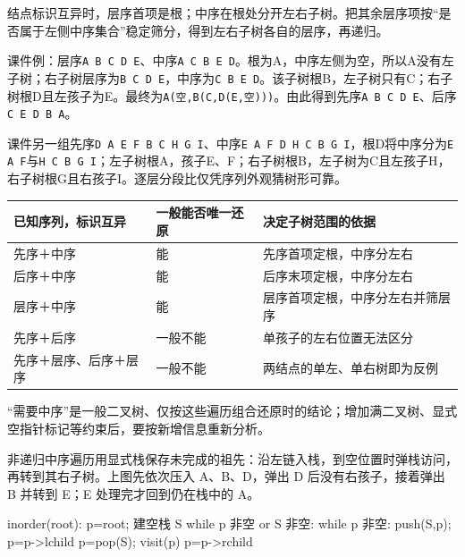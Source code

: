 结点标识互异时，层序首项是根；中序在根处分开左右子树。把其余层序项按``是否属于左侧中序集合''稳定筛分，得到左右子树各自的层序，再递归。

课件例：层序\texttt{A B C D E}、中序\texttt{A C B E D}。根为A，中序左侧为空，所以A没有左子树；右子树层序为\texttt{B C D E}，中序为\texttt{C B E D}。该子树根B，左子树只有C；右子树根D且左孩子为E。最终为\texttt{A(\allowbreak{}空,\allowbreak{}B(\allowbreak{}C,\allowbreak{}D(\allowbreak{}E,\allowbreak{}空)\allowbreak{})\allowbreak{})\allowbreak{}}。由此得到先序\texttt{A B C D E}、后序\texttt{C E D B A}。

课件另一组先序\texttt{D A E F B C H G I}、中序\texttt{E A F D H C B G I}，根D将中序分为\texttt{E A F}与\texttt{H C B G I}；左子树根A，孩子E、F；右子树根B，左子树为C且左孩子H，右子树根G且右孩子I。逐层分段比仅凭序列外观猜树形可靠。

\par\medskip\noindent\begin{minipage}{\linewidth}\fontsize{9.3}{12}\selectfont\begin{tabularx}{\linewidth}{@{}YYY@{}}
\toprule\noalign{}
已知序列，标识互异 & 一般能否唯一还原 & 决定子树范围的依据 \\
\midrule\noalign{}


先序＋中序 & 能 & 先序首项定根，中序分左右 \\
后序＋中序 & 能 & 后序末项定根，中序分左右 \\
层序＋中序 & 能 & 层序首项定根，中序分左右并筛层序 \\
先序＋后序 & 一般不能 & 单孩子的左右位置无法区分 \\
先序＋层序、后序＋层序 & 一般不能 & 两结点的单左、单右树即为反例 \\
\bottomrule\end{tabularx}
\end{minipage}\par\medskip

``需要中序''是一般二叉树、仅按这些遍历组合还原时的结论；增加满二叉树、显式空指针标记等约束后，要按新增信息重新分析。

非递归中序遍历用显式栈保存未完成的祖先：沿左链入栈，到空位置时弹栈访问，再转到其右子树。上图先依次压入 A、B、D，弹出 D 后没有右孩子，接着弹出 B 并转到 E；E 处理完才回到仍在栈中的 A。

\par\medskip\noindent\begin{minipage}{\linewidth}
\begin{codeblock}[language={}]
inorder(root):
    p=root; 建空栈 S
    while p 非空 or S 非空:
        while p 非空:
            push(S,p); p=p->lchild
        p=pop(S); visit(p)
        p=p->rchild
\end{codeblock}
\end{minipage}\par\medskip

